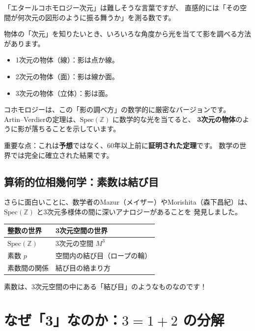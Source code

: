 \documentclass[12pt,a4paper]{article}
\begin{document}
「エタールコホモロジー次元」は難しそうな言葉ですが、
直感的には「その空間が何次元の図形のように振る舞うか」を測る数です。

\begin{analogy}[影のアナロジー]
物体の「次元」を知りたいとき、いろいろな角度から光を当てて影を調べる方法があります。
\begin{itemize}
  \item 1次元の物体（線）：影は点か線。
  \item 2次元の物体（面）：影は線か面。
  \item 3次元の物体（立体）：影は面。
\end{itemize}
コホモロジーは、この「影の調べ方」の数学的に厳密なバージョンです。
Artin--Verdierの定理は、$\mathrm{Spec}(\mathbb{Z})$ に数学的な光を当てると、
\textbf{3次元の物体}のように影が落ちることを示しています。
\end{analogy}

重要な点：これは\textbf{予想}ではなく、60年以上前に\textbf{証明された定理}です。
数学の世界では完全に確立された結果です。

\subsection{算術的位相幾何学：素数は結び目}

さらに面白いことに、数学者のMazur（メイザー）やMorishita（森下昌紀）は、
$\mathrm{Spec}(\mathbb{Z})$ と3次元多様体の間に深いアナロジーがあることを
発見しました。

\begin{funfact}[素数＝結び目]
\begin{center}
\begin{tabular}{ll}
\toprule
\textbf{整数の世界} & \textbf{3次元空間の世界} \\
\midrule
$\mathrm{Spec}(\mathbb{Z})$ & 3次元の空間 $M^3$ \\
素数 $p$ & 空間内の結び目（ロープの輪） \\
素数間の関係 & 結び目の絡まり方 \\
\bottomrule
\end{tabular}
\end{center}
素数は、3次元空間の中にある「結び目」のようなものなのです！
\end{funfact}

\section{なぜ「3」なのか：$3 = 1 + 2$ の分解}
\end{document}
